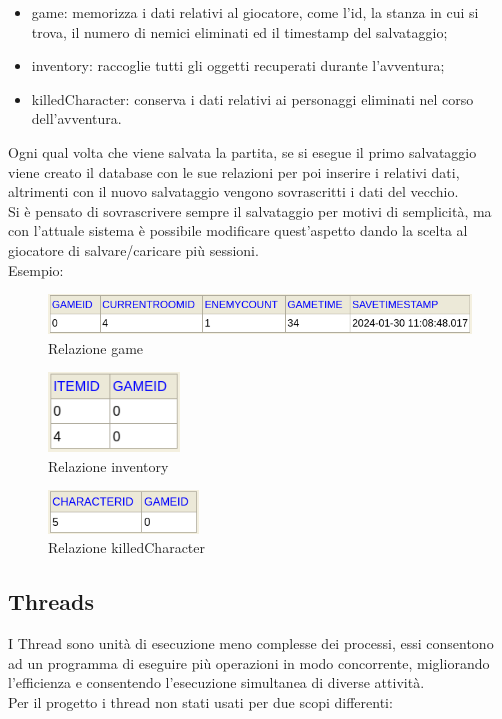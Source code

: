 \documentclass[italian,12pt,a4paper]{article}
\begin{document}
	\begin{itemize}
		\item game: memorizza i dati relativi al giocatore, come l'id, la stanza in cui si trova, il numero di nemici eliminati ed il timestamp del salvataggio;
		\item inventory: raccoglie tutti gli oggetti recuperati durante l'avventura;
		\item killedCharacter: conserva i dati relativi ai personaggi eliminati nel corso dell'avventura.
	\end{itemize}
	Ogni qual volta che viene salvata la partita, se si esegue il primo salvataggio viene creato il database con le sue relazioni per poi inserire i relativi dati, altrimenti con il nuovo salvataggio vengono sovrascritti i dati del vecchio.\\
	\linebreak
	Si è pensato di sovrascrivere sempre il salvataggio per motivi di semplicità, ma con l'attuale sistema è possibile modificare quest'aspetto dando la scelta al giocatore di salvare/caricare più sessioni.\\
	\linebreak
	Esempio:
	\begin{figure}[!h]
		\centering
		\includegraphics[width=13cm]{db_game.png}
		\caption{Relazione game}
		\label{fig:screen_db1}
	\end{figure}
	\begin{figure}[!h]
		\centering
		\includegraphics[width=3.5cm]{db_inv.png}
		\caption{Relazione inventory}
		\label{fig:screen_db2}
	\end{figure}
	\begin{figure}[!h]
		\centering
		\includegraphics[width=4cm]{db_char.png}
		\caption{Relazione killedCharacter}
		\label{fig:screen_db3}
	\end{figure}
	
	\subsection{Threads}
	I Thread sono unità di esecuzione meno complesse dei processi, essi consentono ad un programma di eseguire più operazioni in modo concorrente, migliorando l'efficienza e consentendo l'esecuzione simultanea di diverse attività. \\
	Per il progetto i thread non stati usati per due scopi differenti:
	
\end{document}
